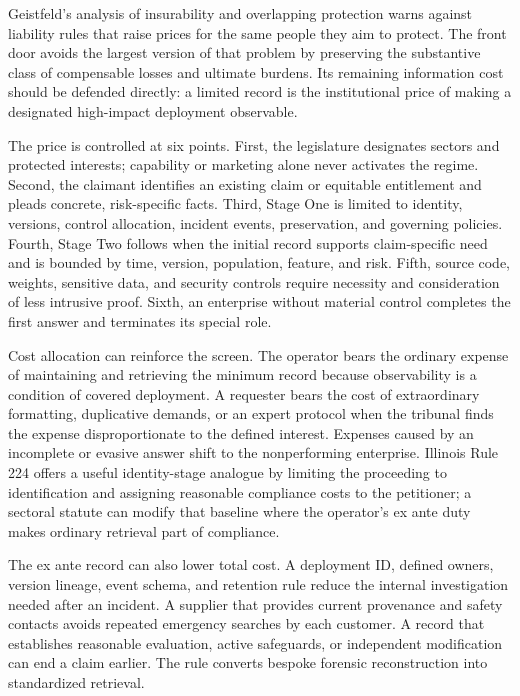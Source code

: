 Geistfeld's analysis of insurability and overlapping protection warns against liability rules that raise prices for the same people they aim to protect. The front door avoids the largest version of that problem by preserving the substantive class of compensable losses and ultimate burdens. Its remaining information cost should be defended directly: a limited record is the institutional price of making a designated high-impact deployment observable.

The price is controlled at six points. First, the legislature designates sectors and protected interests; capability or marketing alone never activates the regime. Second, the claimant identifies an existing claim or equitable entitlement and pleads concrete, risk-specific facts. Third, Stage One is limited to identity, versions, control allocation, incident events, preservation, and governing policies. Fourth, Stage Two follows when the initial record supports claim-specific need and is bounded by time, version, population, feature, and risk. Fifth, source code, weights, sensitive data, and security controls require necessity and consideration of less intrusive proof. Sixth, an enterprise without material control completes the first answer and terminates its special role.

Cost allocation can reinforce the screen. The operator bears the ordinary expense of maintaining and retrieving the minimum record because observability is a condition of covered deployment. A requester bears the cost of extraordinary formatting, duplicative demands, or an expert protocol when the tribunal finds the expense disproportionate to the defined interest. Expenses caused by an incomplete or evasive answer shift to the nonperforming enterprise. Illinois Rule 224 offers a useful identity-stage analogue by limiting the proceeding to identification and assigning reasonable compliance costs to the petitioner; a sectoral statute can modify that baseline where the operator's ex ante duty makes ordinary retrieval part of compliance.

The ex ante record can also lower total cost. A deployment ID, defined owners, version lineage, event schema, and retention rule reduce the internal investigation needed after an incident. A supplier that provides current provenance and safety contacts avoids repeated emergency searches by each customer. A record that establishes reasonable evaluation, active safeguards, or independent modification can end a claim earlier. The rule converts bespoke forensic reconstruction into standardized retrieval.

